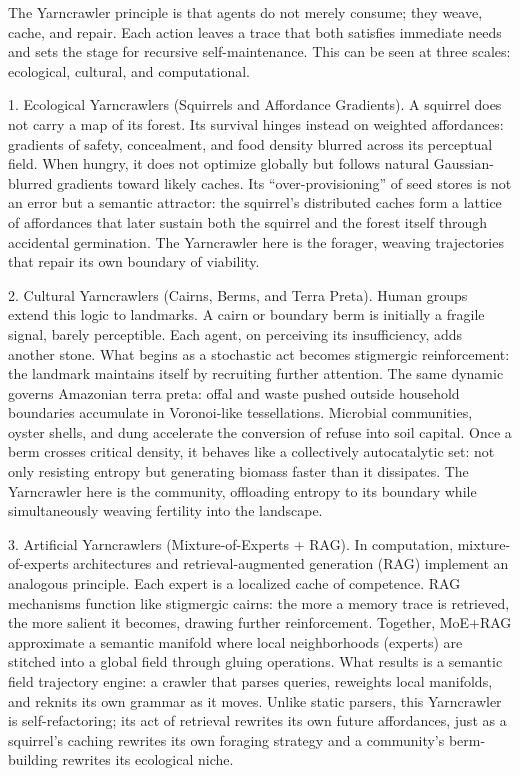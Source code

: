 \documentclass{article}
\begin{document}
The Yarncrawler principle is that agents do not merely consume; they weave, cache, and repair. Each action leaves a trace that both satisfies immediate needs and sets the stage for recursive self-maintenance. This can be seen at three scales: ecological, cultural, and computational.

1. Ecological Yarncrawlers (Squirrels and Affordance Gradients).
A squirrel does not carry a map of its forest. Its survival hinges instead on weighted affordances: gradients of safety, concealment, and food density blurred across its perceptual field. When hungry, it does not optimize globally but follows natural Gaussian-blurred gradients toward likely caches. Its “over-provisioning” of seed stores is not an error but a semantic attractor: the squirrel’s distributed caches form a lattice of affordances that later sustain both the squirrel and the forest itself through accidental germination. The Yarncrawler here is the forager, weaving trajectories that repair its own boundary of viability.

2. Cultural Yarncrawlers (Cairns, Berms, and Terra Preta).
Human groups extend this logic to landmarks. A cairn or boundary berm is initially a fragile signal, barely perceptible. Each agent, on perceiving its insufficiency, adds another stone. What begins as a stochastic act becomes stigmergic reinforcement: the landmark maintains itself by recruiting further attention. The same dynamic governs Amazonian terra preta: offal and waste pushed outside household boundaries accumulate in Voronoi-like tessellations. Microbial communities, oyster shells, and dung accelerate the conversion of refuse into soil capital. Once a berm crosses critical density, it behaves like a collectively autocatalytic set: not only resisting entropy but generating biomass faster than it dissipates. The Yarncrawler here is the community, offloading entropy to its boundary while simultaneously weaving fertility into the landscape.

3. Artificial Yarncrawlers (Mixture-of-Experts + RAG).
In computation, mixture-of-experts architectures and retrieval-augmented generation (RAG) implement an analogous principle. Each expert is a localized cache of competence. RAG mechanisms function like stigmergic cairns: the more a memory trace is retrieved, the more salient it becomes, drawing further reinforcement. Together, MoE+RAG approximate a semantic manifold where local neighborhoods (experts) are stitched into a global field through gluing operations. What results is a semantic field trajectory engine: a crawler that parses queries, reweights local manifolds, and reknits its own grammar as it moves. Unlike static parsers, this Yarncrawler is self-refactoring; its act of retrieval rewrites its own future affordances, just as a squirrel’s caching rewrites its own foraging strategy and a community’s berm-building rewrites its ecological niche.
\end{document}
